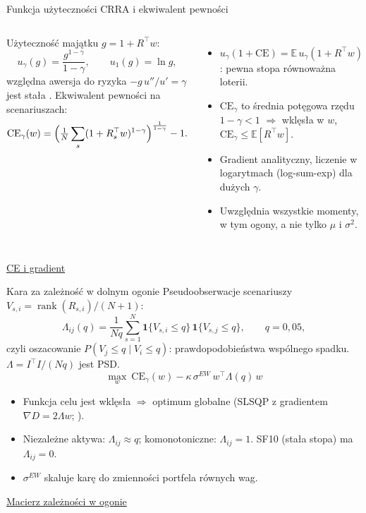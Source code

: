 \documentclass[aspectratio=169,11pt]{beamer}
\newcommand{\repo}{https://github.com/michalmarchwiak/bsc-project}
\newcommand{\rev}{9e941db56fde866672b262f5f6725268ce58feb7}
\newcommand{\src}[2]{\vfill{\scriptsize\color{Teal}%
  \href{\repo/blob/\rev/#1}{#2}}}
\newcommand{\ind}{\mathbf{1}}
\newcommand{\E}{\mathbb{E}}
\begin{document}
\begin{frame}{Funkcja użyteczności CRRA i ekwiwalent pewności}
  \begin{columns}[T,onlytextwidth]
    Użyteczność majątku \(g=1+R^\top w\):
    \[
      u_\gamma(g)=\frac{g^{1-\gamma}}{1-\gamma},\qquad
      u_1(g)=\ln g,
    \]
    względna awersja do ryzyka \(-g\,u''/u'=\gamma\) jest stała
    \citep{pratt1964}.
    Ekwiwalent pewności na scenariuszach:
    \[
      \mathrm{CE}_\gamma(w)=\Bigl(\tfrac1N\sum_{s}
        (1+R_s^\top w)^{1-\gamma}\Bigr)^{\frac{1}{1-\gamma}}-1 .
    \]
    \begin{itemize}
      \item \(u_\gamma(1+\mathrm{CE})=\E\,u_\gamma(1+R^\top w)\):
        pewna stopa równoważna loterii.
      \item \(\mathrm{CE}_\gamma\) to średnia potęgowa rzędu
        \(1-\gamma<1\) \(\Rightarrow\) wklęsła w \(w\),
        \(\mathrm{CE}_\gamma\le\E[R^\top w]\).
      \item Gradient analityczny, liczenie w logarytmach
        (log-sum-exp) dla dużych \(\gamma\).
      \item Uwzględnia wszystkie momenty, w tym ogony,
        a nie tylko \(\mu\) i \(\sigma^2\).
    \end{itemize}
  \end{columns}
  \src{src/pf/opt/utility.py}{CE i gradient}
\end{frame}

\begin{frame}{Kara za zależność w dolnym ogonie}
  Pseudoobserwacje scenariuszy \(V_{s,i}=\operatorname{rank}(R_{s,i})/(N+1)\):
  \[
    \Lambda_{ij}(q)=\frac{1}{Nq}\sum_{s=1}^N
      \ind\{V_{s,i}\le q\}\,\ind\{V_{s,j}\le q\},\qquad q=0{,}05,
  \]
  czyli oszacowanie \(P(V_j\le q\mid V_i\le q)\): prawdopodobieństwa
  wspólnego spadku. \(\Lambda=I^\top I/(Nq)\) jest PSD.
  \[
    \max_w\ \mathrm{CE}_\gamma(w)-\kappa\,\sigma^{EW}\,w^\top\Lambda(q)\,w
  \]
  \begin{itemize}
    \item Funkcja celu jest wklęsła \(\Rightarrow\) optimum globalne
      (SLSQP z gradientem \(\nabla D=2\Lambda w\);
      \citealp{scipy2020}).
    \item Niezależne aktywa: \(\Lambda_{ij}\approx q\); komonotoniczne:
      \(\Lambda_{ij}=1\). SF10 (stała stopa) ma \(\Lambda_{ij}=0\).
    \item \(\sigma^{EW}\) skaluje karę do zmienności portfela równych wag.
  \end{itemize}
  \src{src/pf/opt/dependence_penalty.py}{Macierz zależności w ogonie}
\end{frame}
\end{document}
